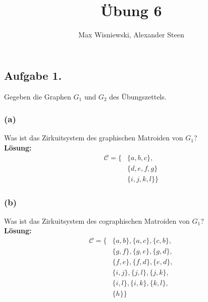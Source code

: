 \documentclass[11pt,a4paper,ngerman]{article}
\date{}
\title{Übung 6}
\author{Max Wisniewski, Alexander Steen}
\begin{document}

\renewcommand{\figurename}{Figure}

\maketitle
\thispagestyle{fancy}

\subsection*{Aufgabe 1.}

Gegeben die Graphen $G_1$ und $G_2$ des Übungszettels.

\subsubsection*{(a)}
Was ist das Zirkuitsystem des graphischen Matroiden von $G_1$?\\

\textbf{Lösung:}\\

\begin{equation*}\begin{split}
    \mathcal{C} = \{ 
            & \{a,b,c\},\\
            & \{ d , e, f, g \}\\
            & \{ i , j , k , l\}\}
\end{split}\end{equation*}

\subsubsection*{(b)}
Was ist das Zirkuitsystem des cographischen Matroiden von $G_1$?\\

\textbf{Lösung:}\\

\begin{equation*}\begin{split}
    \mathcal{C} = \{ 
        & \{ a , b \}, \{ a , c \}, \{ c , b \}, \\
        & \{ g , f \}, \{ g , e \}, \{ g , d \}, \\
        & \{ f , e \}, \{ f , d \}, \{ e , d \}, \\
        & \{ i , j \}, \{ j , l \}, \{ j , k \}, \\
        & \{ i , l \}, \{ i , k \}, \{ k , l \}, \\
        & \{ h \} \}
\end{split}\end{equation*}
\end{document}
